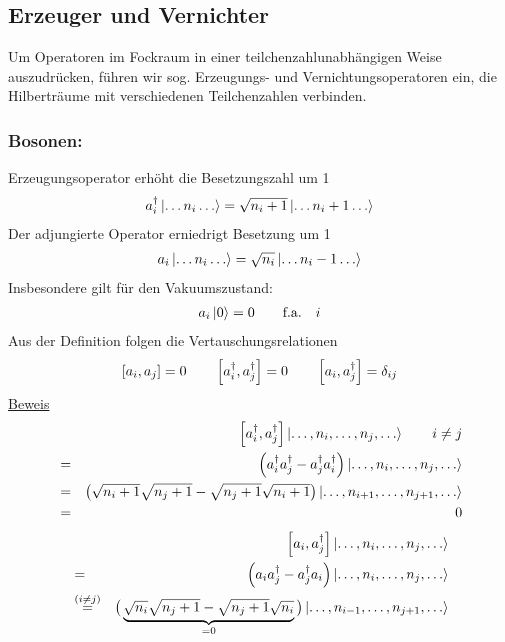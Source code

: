 \subsection{Erzeuger und Vernichter}
Um Operatoren im Fockraum in einer teilchenzahlunabhängigen Weise auszudrücken, führen wir sog. Erzeugungs- und Vernichtungsoperatoren ein, die Hilberträume mit verschiedenen Teilchenzahlen verbinden.
\subsubsection{Bosonen:} Erzeugungsoperator erhöht die Besetzungszahl um 1
\begin{eqnarray*}
a_i^\dagger \left | \dots n_i \dots \ro = \sqrt{n_i + 1 } \left | \dots n_i + 1\dots \ro 
\end{eqnarray*}
Der adjungierte Operator erniedrigt Besetzung um 1
\begin{eqnarray*}
a_i \left | \dots n_i \dots \ro = \sqrt {n_i} \left | \dots n_i - 1 \dots \ro
\end{eqnarray*}
Insbesondere gilt für den Vakuumszustand:
\begin{eqnarray*}
a_i \left | 0 \right > = 0\qquad \text{f.a.}\quad i
\end{eqnarray*}
Aus der Definition folgen die Vertauschungsrelationen
\begin{eqnarray*}
\left [ a_i,a_j \right] = 0  \qquad \left[a_i^\dagger,a_j^\dagger\right] = 0 \qquad \left[ a_i,a_j^\dagger \right] = \delta_{i j}
\end{eqnarray*}
\underline{Beweis}
\begin{eqnarray*}
&{}&\left[a_i^\dagger ,a_j^\dagger\ri ] \left | \dots,n_i,\dots,n_j,\dots\ro \qquad i\neq j\\
\g \left(a_i^\dagger a_j^\dagger - a_j^\dagger a_i^\dagger \ri ) \left | \dots, n_i,\dots,n_j,\dots\ro\\
\g \left( \sqrt{n_i+1}\sqrt{n_j+1}-\sqrt{n_j+1}\sqrt{n_i+1}\ri)\left|\dots,n_{i+1},\dots,n_{j+1},\dots\ro\\
\g  0
\end{eqnarray*}
\begin{eqnarray*}
&{}&\left[a_i,a_j^\dagger\ri] \left | \dots ,n_i,\dots,n_j,\dots\ro\\
\g \left(a_i a_j^\dagger - a_j^\dagger a_i\ri ) \left | \dots,n_i,\dots,n_j,\dots\ro\\
&\overset{(i\neq j)} =& \big(\underbrace{\sqrt{n_i}\sqrt{n_j+1} - \sqrt{n_j+1}\sqrt{n_i}}_{=0}\big) \left| \dots,n_{i-1},\dots,n_{j+1},\dots\ro
\end{eqnarray*}
